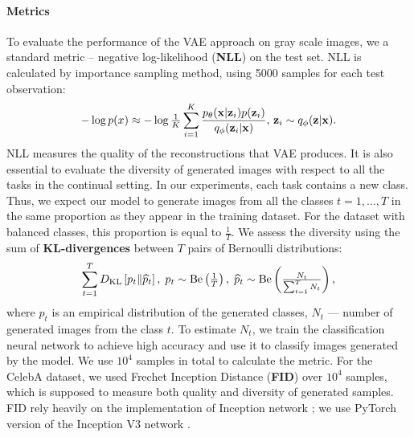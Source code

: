 \paragraph{Metrics} To evaluate the performance of the VAE approach on gray scale images, we a standard metric -- negative log-likelihood (\textbf{NLL}) on the test set. NLL is calculated by importance sampling method, using 5000 samples for each test observation: 
\begin{equation*}
\setlength{\abovedisplayskip}{3.5pt}
\setlength{\belowdisplayskip}{3.5pt}
-\log p(x) \approx -\log \tfrac{1}{K} 
\sum_{i = 1}^K \frac{p_\theta(\rvx |\rvz_i) p(\rvz_i)}{q_\phi(\rvz_i | \rvx)},\,\rvz_i \sim q_\phi(\rvz| \rvx).
\end{equation*}
NLL measures the quality of the reconstructions that VAE produces. It is also essential to evaluate the diversity of generated images with respect to all the tasks in the continual setting. In our experiments, each task contains a new class. Thus, we expect our model to generate images from all the classes $t=1,\dots, T$ in the same proportion as they appear in the training dataset. For the dataset with balanced classes, this proportion is equal to $\tfrac{1}{T}$. We assess the diversity using the sum of \textbf{KL-divergences} between $T$ pairs of Bernoulli distributions:
\begin{equation*}
\setlength{\abovedisplayskip}{3.5pt}
\setlength{\belowdisplayskip}{3.5pt}
\sum_{t=1}^{T}\KL{p_t}{\widehat{p}_t},\; p_t \sim \text{Be}\left(\tfrac1T\right),\;  \widehat{p}_t \sim \text{Be}\left(\tfrac{N_t}{\sum_{t=1}^{T}N_t}\right), 
\end{equation*}
where $ \widehat{p}_t$ is an empirical distribution of the generated classes, $N_t$ --- number of generated images from the class $t$. To estimate $N_t$, we train the classification neural network to achieve high accuracy and use it to classify images generated by the model. We use $10^4$ samples in total to calculate the metric.
For the CelebA dataset, we used Frechet Inception Distance (\textbf{FID}) \citep{heusel2017gans} over $10^4$ samples, which is supposed to measure both quality and diversity of generated samples. FID rely heavily on the implementation of Inception network \citep{barratt2018note}; we use PyTorch version of the Inception V3 network \citep{paszke2017automatic}.
